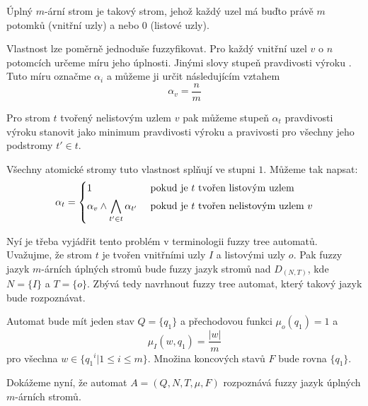 \documentclass[a4paper,10pt]{article}
\begin{document}
\begin{definition}
 Úplný $m$-ární strom je takový strom, jehož každý uzel má buďto právě $m$ potomků (vnitřní uzly) a nebo $0$ (listové uzly).
\end{definition}

Vlastnost  lze poměrně jednoduše fuzzyfikovat. Pro každý vnitřní uzel $v$ o $n$ potomcích určeme míru jeho úplnosti. Jinými slovy stupeň pravdivosti výroku . Tuto míru označme $\alpha_i$ a můžeme ji určit následujícím vztahem
$$
  \alpha_v = \frac{n}{m}
$$

Pro strom $t$ tvořený nelistovým uzlem $v$ pak můžeme stupeň $\alpha_t$ pravdivosti výroku  stanovit jako minimum pravdivosti výroku  a pravivosti  pro všechny jeho podstromy $t' \in t$.

Všechny atomické stromy tuto vlastnost splňují ve stupni $1$. Můžeme tak napsat:
$$
  \alpha_t = 
    \begin{dcases}
      1 				& \text{ pokud je $t$ tvořen listovým uzlem} \\
      \alpha_v \wedge \bigwedge_{t' \in t} \alpha_{t'} 	& \text{ pokud je $t$ tvořen nelistovým uzlem $v$}
    \end{dcases}
$$

Nyí je třeba vyjádřit tento problém v terminologii fuzzy tree automatů. Uvažujme, že strom $t$ je tvořen vnitřními uzly $I$ a listovými uzly $o$. Pak fuzzy jazyk $m$-árních úplných stromů bude fuzzy jazyk stromů nad $D_{(N,T)}$, kde $N = \{ I \}$ a $T = \{ o \}$. Zbývá tedy navrhnout fuzzy tree automat, který takový jazyk bude rozpoznávat.

Automat bude mít jeden stav $Q = \{ q_1 \}$ a přechodovou funkci $\mu_o(q_1) = 1$ a 
$$
  \mu_I(w, q_1) = \frac{|w|}{m}
$$
pro všechna $w \in \{ {q_1}^i |  1 \leq i \leq m \}$. Množina koncových stavů $F$ bude rovna $\{ q_1 \}$.

Dokážeme nyní, že automat $A = (Q, N, T, \mu, F)$ rozpoznává fuzzy jazyk úplných $m$-árních stromů. 
\end{document}
